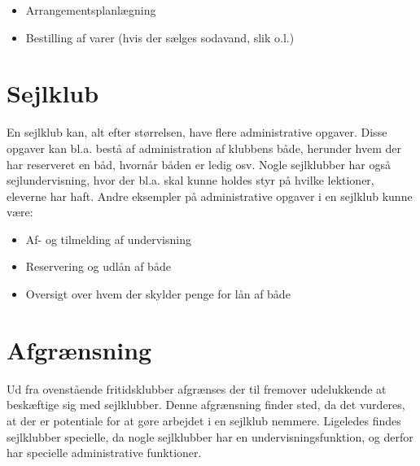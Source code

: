 \begin{itemize}
  \item Arrangementsplanlægning
  \item Bestilling af varer (hvis der sælges sodavand, slik o.l.)
\end{itemize}


\section{Sejlklub}

En sejlklub kan, alt efter størrelsen, have flere administrative opgaver. 
Disse opgaver kan bl.a. bestå af administration af klubbens både, herunder hvem der har reserveret en båd, hvornår båden er ledig osv.
Nogle sejlklubber har også sejlundervisning, hvor der bl.a. skal kunne holdes styr på hvilke lektioner, eleverne har haft. 
Andre eksempler på administrative opgaver i en sejlklub kunne være:

\begin{itemize}
  \item Af- og tilmelding af undervisning
  \item Reservering og udlån af både 
  \item Oversigt over hvem der skylder penge for lån af både
\end{itemize}

\section{Afgrænsning}

Ud fra ovenstående fritidsklubber afgrænses der til fremover udelukkende at beskæftige sig med sejlklubber. 
Denne afgrænsning finder sted, da det vurderes, at der er potentiale for at gøre arbejdet i en sejlklub nemmere. 
Ligeledes findes sejlklubber specielle, da nogle sejlklubber har en undervisningsfunktion, og derfor har specielle administrative funktioner.
